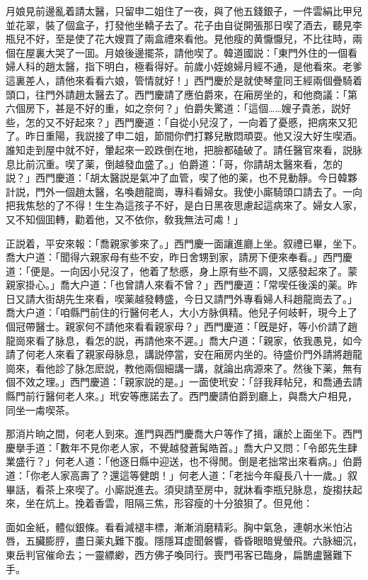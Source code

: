 月娘見前邊亂着請太醫，只留申二姐住了一夜，與了他五錢銀子，一件雲絹比甲兒並花翠，裝了個盒子，打發他坐轎子去了。花子由自従開張那日喫了酒去，聽見李瓶兒不好，至是使了花大嫂買了兩盒禮來看他。見他瘦的黄懨懨兒，不比往時，兩個在屋裏大哭了一囬。月娘後邊擺茶，請他喫了。韓道國説：「東門外住的一個看婦人科的趙太醫，指下明白，極看得好。前歲小姪媳婦月經不通，是他看來。老爹這裏差人，請他來看看六娘，管情就好！」西門慶於是就使琴童同王經兩個疊騎着頭口，往門外請趙太醫去了。西門慶請了應伯爵來，在廂房坐的，和他商議：「第六個房下，甚是不好的重，如之奈何？」伯爵失驚道：「這個……嫂子貴恙，説好些，怎的又不好起來？」西門慶道：「自從小兒沒了，一向着了憂慼，把病來又犯了。昨日重陽，我説接了申二姐，節間你們打夥兒散悶頑耍。他又沒大好生喫酒。誰知走到屋中就不好，暈起來一跤跌倒在地，把臉都磕破了。請任醫官來看，説脉息比前沉重。喫了薬，倒越發血盛了。」伯爵道：「哥，你請胡太醫來看，怎的説？」西門慶道：「胡太醫説是氣冲了血管，喫了他的薬，也不見動靜。今日韓夥計説，門外一個趙太醫，名喚趙龍崗，專科看婦女。我使小廝騎頭口請去了。一向把我焦愁的了不得！生生為這孩子不好，是白日黑夜思慮起這病來了。婦女人家，又不知個囬轉，勸着他，又不依你，敎我無法可䖏！」

正説着，平安來報：「喬親家爹來了。」西門慶一面讓進廳上坐。叙禮已畢，坐下。喬大户道：「聞得六親家母有些不安，昨日舍甥到家，請房下便來奉看。」西門慶道：「便是。一向因小兒沒了，他着了愁慼，身上原有些不調，又感發起來了。蒙親家掛心。」喬大户道：「也曾請人來看不曾？」西門慶道：「常喫任後溪的薬。昨日又請大街胡先生來看，喫薬越發轉盛，今日又請門外專看婦人科趙龍崗去了。」喬大户道：「咱縣門前住的行醫何老人，大小方脉俱精。他兒子何岐軒，現今上了個冠帶醫士。親家何不請他來看看親家母？」西門慶道：「旣是好，等小价請了趙龍崗來看了脉息，看怎的説，再請他來不遲。」喬大户道：「親家，依我愚見，如今請了何老人來看了親家母脉息，講説停當，安在廂房内坐的。待盛价門外請將趙龍崗來，看他診了脉怎麽説，教他兩個細講一講，就論出病源來了。然後下薬，無有個不效之理。」西門慶道：「親家説的是。」一面使玳安：「㧱我拜帖兒，和喬通去請縣門前行醫何老人來。」玳安等應諾去了。西門慶請伯爵到廳上，與喬大户相見，同坐一䖏喫茶。

那消片晌之間，何老人到來。進門與西門慶喬大户等作了揖，讓於上面坐下。西門慶擧手道：「數年不見你老人家，不覺越發蒼髯皓首。」喬大户又問：「令郎先生肆業盛行？」何老人道：「他逐日縣中迎送，也不得閒。倒是老拙常出來看病。」伯爵道：「你老人家高壽了？還這等健朗！」何老人道：「老拙今年癡長八十一歲。」叙畢話，看茶上來喫了。小廝説進去。須臾請至房中，就牀看李瓶兒脉息，旋搊扶起來，坐在炕上。挽着香雲，阻隔三焦，形容瘦的十分狼狽了。但見他：

\begin{myquote}
面如金紙，體似銀條。看看減褪丰標，漸漸消磨精彩。胸中氣急，連朝水米怕沾唇，五臟膨脝，盡日薬丸難下腹。隱隱耳虚聞磐響，昏昏眼暗覺螢飛。六脉細沉，東岳判官催命去；一靈縹緲，西方佛子喚同行。喪門弔客已臨身，扁鵲盧醫難下手。
\end{myquote}


